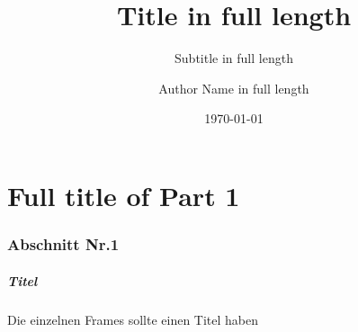 \documentclass[aspectratio=1610, compress, bigger]{beamer}
\title[Short Title]{Title in full length}
\subtitle{Subtitle in full length}
\author[Short Name]{Author Name in full length}
\date[\today]{\today}
\begin{document}

%

\frame[plain]{\maketitle}



\part[Part 1]{Full title of Part 1}

\frame[plain]{\partpage}


\section{Abschnitt Nr.1} 
\begin{frame}\frametitle{Titel} 
	Die einzelnen Frames sollte einen Titel haben 
\end{frame}
\end{document}
